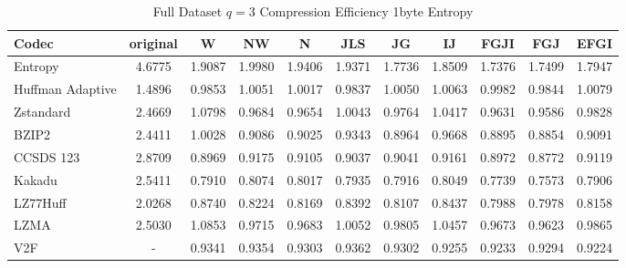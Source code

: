\documentclass{article}
\begin{document}
\begin{table}[h!]
\centering
\caption{Full Dataset $q=3$ Compression Efficiency 1byte Entropy}
\begin{tabular}{|l|cccccccccc|}
\hline
Codec &  original &      W &     NW &      N &    JLS &     JG &     IJ &   FGJI &    FGJ &   EFGI \\
\hline
Entropy & 4.6775 & 1.9087 & 1.9980 & 1.9406 & 1.9371 & 1.7736 & 1.8509 & 1.7376 & 1.7499 & 1.7947 \\
\hline
Huffman Adaptive &    1.4896 & 0.9853 & 1.0051 & 1.0017 & 0.9837 & 1.0050 & 1.0063 & 0.9982 & 0.9844 & 1.0079 \\
Zstandard        &    2.4669 & 1.0798 & 0.9684 & 0.9654 & 1.0043 & 0.9764 & 1.0417 & 0.9631 & 0.9586 & 0.9828 \\
BZIP2            &    2.4411 & 1.0028 & 0.9086 & 0.9025 & 0.9343 & 0.8964 & 0.9668 & 0.8895 & 0.8854 & 0.9091 \\
CCSDS 123        &    2.8709 & 0.8969 & 0.9175 & 0.9105 & 0.9037 & 0.9041 & 0.9161 & 0.8972 & 0.8772 & 0.9119 \\
Kakadu           &    2.5411 & 0.7910 & 0.8074 & 0.8017 & 0.7935 & 0.7916 & 0.8049 & 0.7739 & 0.7573 & 0.7906 \\
LZ77Huff         &    2.0268 & 0.8740 & 0.8224 & 0.8169 & 0.8392 & 0.8107 & 0.8437 & 0.7988 & 0.7978 & 0.8158 \\
LZMA             &    2.5030 & 1.0853 & 0.9715 & 0.9683 & 1.0052 & 0.9805 & 1.0457 & 0.9673 & 0.9623 & 0.9865 \\
V2F              &    - & 0.9341 & 0.9354 & 0.9303 & 0.9362 & 0.9302 & 0.9255 & 0.9233 & 0.9294 & 0.9224 \\
\hline
\end{tabular}
\end{table}
\end{document}
